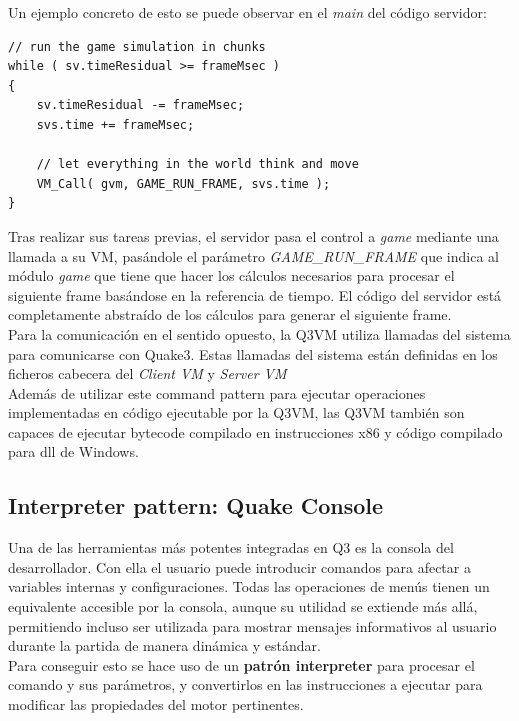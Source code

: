 \documentclass[a4paper,12pt]{report}
\begin{document}
	Un ejemplo concreto de esto se puede observar en el \textit{main} del código servidor:
	
		\begin{lstlisting}[style=C, numbers=none]
// run the game simulation in chunks
while ( sv.timeResidual >= frameMsec ) 
{
	sv.timeResidual -= frameMsec;
	svs.time += frameMsec;
	
	// let everything in the world think and move
	VM_Call( gvm, GAME_RUN_FRAME, svs.time );
}
	\end{lstlisting}
	
	Tras realizar sus tareas previas, el servidor pasa el control a \textit{game} mediante una llamada a su VM, pasándole el parámetro \textit{GAME\_RUN\_FRAME} que indica al módulo \textit{game} que tiene que hacer los cálculos necesarios para procesar el siguiente frame basándose en la referencia de tiempo. El código del servidor está completamente abstraído de los cálculos para generar el siguiente frame.\cite{q3vmcallex}\\

	Para la comunicación en el sentido opuesto, la Q3VM utiliza llamadas del sistema para comunicarse con Quake3. Estas llamadas del sistema están definidas en los ficheros cabecera del \textit{Client VM}\cite{q3vmclient} y \textit{Server VM}\cite{q3vmserver}\\
	
	
	Además de utilizar este command pattern para ejecutar operaciones implementadas en código ejecutable por la Q3VM, las Q3VM también son capaces de ejecutar bytecode compilado en instrucciones x86 y código compilado para dll de Windows. \cite{q3vmbb}
	
	
		\subsection{Interpreter pattern: Quake Console}
	Una de las herramientas más potentes integradas en Q3 es la consola del desarrollador. Con ella el usuario puede introducir comandos para afectar a variables internas y configuraciones. Todas las operaciones de menús tienen un equivalente accesible por la consola, aunque su utilidad se extiende más allá, permitiendo incluso ser utilizada para mostrar mensajes informativos al usuario durante la partida de manera dinámica y estándar.\\
	\newpage
	Para conseguir esto se hace uso de un \textbf{patrón interpreter} para procesar el comando y sus parámetros, y convertirlos en las instrucciones a ejecutar para modificar las propiedades del motor pertinentes.\cite{console_source}\cite{consolecmd_source}\\
	
\end{document}
